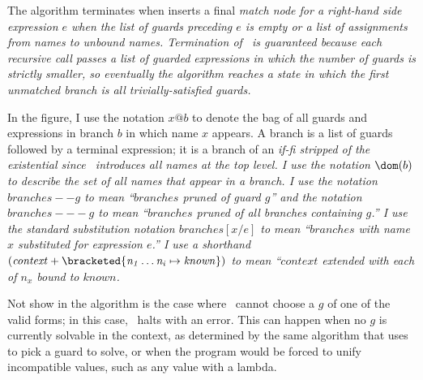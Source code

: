 \documentclass[manuscript,screen,review, 12pt, nonacm]{acmart}
\begin{document}
    The algorithm terminates when inserts a final \it{match} node for a
    right-hand side expression $e$ when the list of guards preceding $e$ is
    empty or a list of assignments from names to unbound names. Termination of
    \DTran\ is guaranteed because each recursive call passes a list of guarded
    expressions in which the number of guards is strictly smaller, so eventually
    the algorithm reaches a state in which the first unmatched branch is all
    trivially-satisfied guards. 

    In the figure, I use the notation $x@b$ to denote the bag of all guards and
    expressions in branch $b$ in which name $x$ appears. A branch is a list of
    guards followed by a terminal expression; it is a branch of an \it{if-fi}
    stripped of the existential since \DTran\ introduces all names at the top
    level. I use the notation $\dom(b)$ to describe the set of all names that
    appear in a branch. I use the notation $\mathit{branches -- g}$ to mean
    “$\mathit{branches}$ pruned of guard $g$” and the notation $\mathit{branches
    --- g}$ to mean “$\mathit{branches}$ pruned of all \it{branches} containing
    $g$.” I use the standard substitution notation $\mathit{branches[x/e]}$ to
    mean “$\mathit{branches}$ with name $x$ substituted for expression $e$.” I
    use a shorthand $\mathit{(context + \bracketed{n_1 \dots n_i \mapsto
    known})}$ to mean “$\mathit{context}$ extended with each of $n_x$ bound to
    $\mathit{known}$. 

    Not show in the algorithm is the case where \compile\ cannot choose a $g$ of
    one of the valid forms; in this case, \compile\ halts with an error. This
    can happen when no $g$ is currently solvable in the context, as determined
    by the same algorithm that \VMinus uses to pick a guard to solve, or when
    the program would be forced to unify incompatible values, such as any value
    with a lambda. 

       
\end{document}
